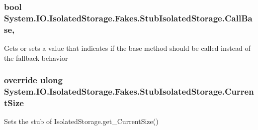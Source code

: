 \hypertarget{class_system_1_1_i_o_1_1_isolated_storage_1_1_fakes_1_1_stub_isolated_storage_a66e73b48638f408a2835400ac00ede24}{
\subsubsection[{Call\-Base}]{\setlength{\rightskip}{0pt plus 5cm}bool System.\-I\-O.\-Isolated\-Storage.\-Fakes.\-Stub\-Isolated\-Storage.\-Call\-Base\hspace{0.3cm}{\ttfamily [get]}, {\ttfamily [set]}}}\label{class_system_1_1_i_o_1_1_isolated_storage_1_1_fakes_1_1_stub_isolated_storage_a66e73b48638f408a2835400ac00ede24}


Gets or sets a value that indicates if the base method should be called instead of the fallback behavior

\hypertarget{class_system_1_1_i_o_1_1_isolated_storage_1_1_fakes_1_1_stub_isolated_storage_af816e68ba851b95fc19d18117580037d}{
\subsubsection[{Current\-Size}]{\setlength{\rightskip}{0pt plus 5cm}override ulong System.\-I\-O.\-Isolated\-Storage.\-Fakes.\-Stub\-Isolated\-Storage.\-Current\-Size\hspace{0.3cm}{\ttfamily [get]}}}\label{class_system_1_1_i_o_1_1_isolated_storage_1_1_fakes_1_1_stub_isolated_storage_af816e68ba851b95fc19d18117580037d}


Sets the stub of Isolated\-Storage.\-get\-\_\-\-Current\-Size()


